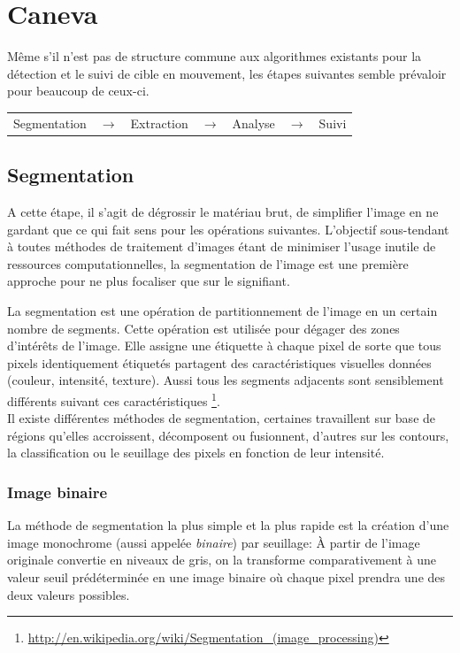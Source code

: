 \documentclass[a4paper,11pt]{report}
\begin{document}
\section{Caneva}
Même s'il n'est pas de structure commune aux algorithmes existants pour la détection et le suivi de cible en mouvement, les étapes suivantes semble prévaloir pour beaucoup de ceux-ci.\\
\begin{center}
\begin{tabular}{ c c c c c c c } 
\cellcolor[gray]{0.9} Segmentation & $\rightarrow$ & \cellcolor[gray]{0.9} Extraction & $\rightarrow$ & \cellcolor[gray]{0.9} Analyse & $\rightarrow$ & \cellcolor[gray]{0.9} Suivi\\  
\end{tabular} 
\end{center}

\subsection{Segmentation}
A cette étape, il s'agit de dégrossir le matériau brut, de simplifier l'image en ne gardant que ce qui fait sens pour les opérations suivantes. L'objectif sous-tendant à toutes méthodes de traitement d'images étant de minimiser l'usage inutile de ressources computationnelles, la segmentation de l'image est une première approche pour ne plus focaliser que sur le signifiant. 

La segmentation est une opération de partitionnement de l'image en un certain nombre de segments. Cette opération est utilisée pour dégager des zones d'intérêts de l'image. Elle assigne une étiquette à chaque pixel de sorte que tous pixels identiquement étiquetés partagent des caractéristiques visuelles données (couleur, intensité, texture). Aussi tous les segments adjacents sont sensiblement différents suivant ces caractéristiques \footnote{\url{http://en.wikipedia.org/wiki/Segmentation_(image_processing)}}.\\

Il existe différentes méthodes de segmentation, certaines travaillent sur base de régions qu'elles accroissent, décomposent ou fusionnent, d'autres sur les contours, la classification ou le seuillage des pixels en fonction de leur intensité.

\subsubsection{Image binaire}
La méthode de segmentation la plus simple et la plus rapide est la création d'une image monochrome (aussi appelée \textit{binaire}) par seuillage: \`A partir de l'image originale convertie en niveaux de gris, on la transforme comparativement à une valeur seuil prédéterminée en une image binaire où chaque pixel prendra une des deux valeurs possibles.\\
\end{document}
